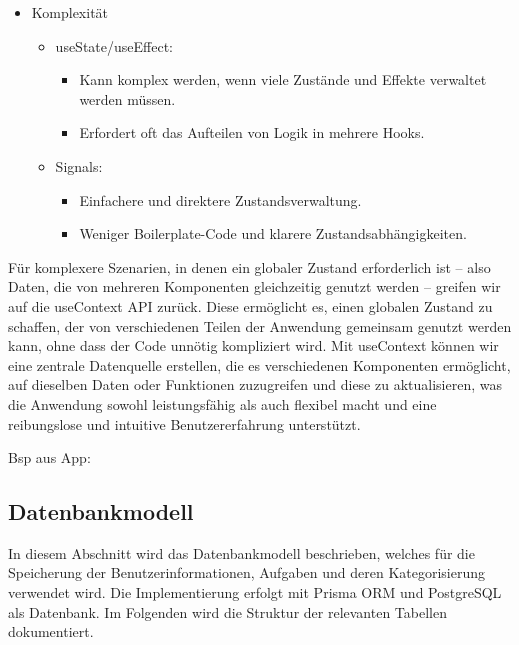 \documentclass[12pt,a4paper]{article} %
\begin{document}
\begin{itemize}
\item Komplexität

\begin{itemize}
\item useState/useEffect:
\begin{itemize}
\item Kann komplex werden, wenn viele Zustände und Effekte verwaltet werden müssen.

\item Erfordert oft das Aufteilen von Logik in mehrere Hooks.
\end{itemize}


\item Signals:
\begin{itemize}
\item Einfachere und direktere Zustandsverwaltung.

\item Weniger Boilerplate-Code und klarere Zustandsabhängigkeiten.

\end{itemize}
\end{itemize}
\end{itemize}

Für komplexere Szenarien, in denen ein globaler Zustand erforderlich ist – also Daten, die von mehreren Komponenten gleichzeitig genutzt werden – greifen wir auf die useContext API zurück. Diese ermöglicht es, einen globalen Zustand zu schaffen, der von verschiedenen Teilen der Anwendung gemeinsam genutzt werden kann, ohne dass der Code unnötig kompliziert wird. Mit useContext können wir eine zentrale Datenquelle erstellen, die es verschiedenen Komponenten ermöglicht, auf dieselben Daten oder Funktionen zuzugreifen und diese zu aktualisieren, was die Anwendung sowohl leistungsfähig als auch flexibel macht und eine reibungslose und intuitive Benutzererfahrung unterstützt.


Bsp aus App:




\subsection{Datenbankmodell}

In diesem Abschnitt wird das Datenbankmodell beschrieben, welches für die Speicherung der Benutzerinformationen, Aufgaben und deren Kategorisierung verwendet wird. Die Implementierung erfolgt mit Prisma ORM und PostgreSQL als Datenbank. Im Folgenden wird die Struktur der relevanten Tabellen dokumentiert.
\end{document}
